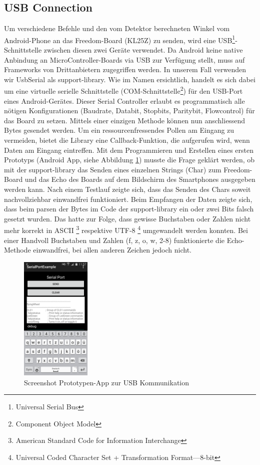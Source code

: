 \subsection{USB Connection}
Um verschiedene Befehle und den vom Detektor berechneten Winkel vom Android-Phone an das Freedom-Board (KL25Z) 
zu senden, wird eine USB\footnote{Universal Serial Bus}-Schnittstelle zwischen diesen zwei Geräte verwendet.
Da Android keine native Anbindung an MicroController-Boards via USB zur Verfügung stellt, muss auf 
Frameworks von Drittanbietern zugegriffen werden. In unserem Fall verwenden wir UsbSerial \cite{Inf:UsbSerial} als support-library. 
Wie im Namen ersichtlich, 
handelt es sich dabei um eine virtuelle serielle Schnittstelle (COM-Schnittstelle\footnote{Component Object Model})
für den USB-Port eines Android-Gerätes. Dieser Serial Controller erlaubt es programmatisch alle nötigen Konfigurationen 
(Baudrate, Databit, Stopbits, Paritybit, Flowcontrol) für das Board zu setzen. Mittels einer einzigen 
Methode können nun anschliessend Bytes gesendet werden. Um ein ressourcenfressendes Pollen am Eingang zu vermeiden, 
bietet die Library eine Callback-Funktion, die aufgerufen wird, wenn Daten am Eingang eintreffen.
Mit dem Programmieren und Erstellen eines ersten Prototyps (Android App, siehe Abbildung \ref{abb:ScreenshotSerialPortExample}) musste die Frage geklärt werden, 
ob mit der support-library das Senden eines einzelnen Strings (Char) zum Freedom-Board und das Echo des 
Boards auf dem Bildschirm des Smartphones ausgegeben werden kann. Nach einem Testlauf zeigte sich, dass
das Senden des Chars soweit nachvollziehbar einwandfrei funktioniert. Beim Empfangen der Daten zeigte 
sich, dass beim parsen der Bytes im Code der support-library ein oder zwei Bits falsch gesetzt wurden. 
Das hatte zur Folge, dass gewisse Buchstaben oder Zahlen nicht mehr korrekt in ASCII 
\footnote{American Standard Code for Information Interchange} respektive UTF-8 
\footnote{Universal Coded Character Set + Transformation Format—8-bit}
umgewandelt werden konnten. Bei einer Handvoll Buchstaben und Zahlen (f, z, o, w, 2-8) funktionierte die
Echo-Methode einwandfrei, bei allen anderen Zeichen jedoch nicht.

\begin{figure}[h!]
	\includegraphics[width=0.3\textwidth,clip,trim=0mm 0mm 0mm 0mm]
	{Enddokumentation/Bilder/Screenshot_SerialPortExample_debug.png}
	\centering
	\caption{Screenshot Prototypen-App zur USB Kommunikation}
	\label{abb:ScreenshotSerialPortExample}
\end{figure}

